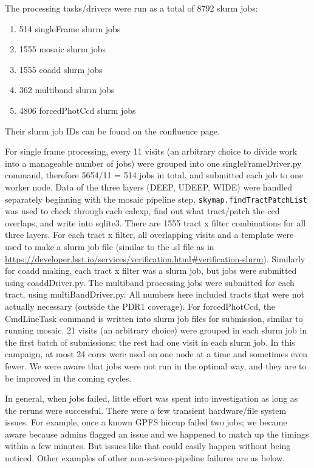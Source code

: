 \documentclass[DM,authoryear,toc]{lsstdoc}
\begin{document}
The processing tasks/drivers were run as a total of 8792 slurm jobs:
\begin{enumerate}
\item
514 singleFrame slurm jobs
\item
1555 mosaic slurm jobs
\item
1555 coadd slurm jobs
\item
362 multiband slurm jobs
\item
4806 forcedPhotCcd slurm jobs
\end{enumerate}
Their slurm job IDs can be found on the confluence page.

For single frame processing, every 11 visits (an arbitrary choice to divide work into a manageable number of jobs) were grouped into one singleFrameDriver.py command, therefore 5654/11 = 514 jobs in total, and submitted each job to one worker node.  Data of the three layers (DEEP, UDEEP, WIDE) were handled separately beginning with the mosaic pipeline step.  \texttt{skymap.findTractPatchList} was used to check through each calexp, find out what tract/patch the ccd overlaps, and write into sqlite3. There are 1555 tract x filter combinations for all three layers. For each tract x filter, all overlapping visits and a template were used to make a slurm job file (similar to the .sl file as in \url{https://developer.lsst.io/services/verification.html#verification-slurm}). Similarly for coadd making, each tract x filter was a slurm job, but jobs were submitted using coaddDriver.py.  The multiband processing jobs were submitted for each tract, using multiBandDriver.py.   All numbers here included tracts that were not actually necessary (outside the PDR1 coverage).  For forcedPhotCcd, the CmdLineTask command is written into slurm job files for submission, similar to running mosaic. 21 visits (an arbitrary choice) were grouped in each slurm job in the first batch of submissions; the rest had one visit in each slurm job. In this campaign, at most 24 cores were used on one node at a time and sometimes even fewer.   We were aware that jobs were not run in the optimal way, and they are to be improved in the coming cycles.

In general, when jobs failed, little effort was spent into investigation as long as the reruns were successful. There were a few transient hardware/file system issues. For example, once a known GPFS hiccup failed two jobs;
we became aware because admins flagged an issue and we happened to match up the timings within a few minutes. But issues like that could easily happen without being noticed.
Other examples of other non-science-pipeline failures are as below.
\end{document}
